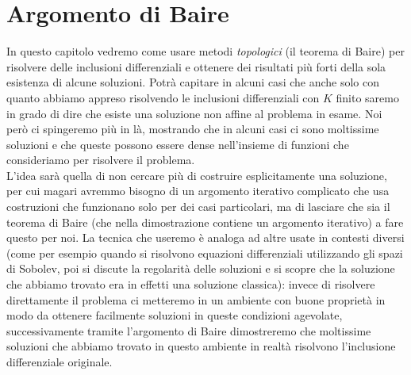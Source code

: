 \documentclass[a4paper,11pt]{book}
\theoremstyle{plain}
\theoremstyle{definition}
\theoremstyle{remark}
\begin{document}
	
\chapter{Argomento di Baire}
In questo capitolo vedremo come usare metodi \textit{topologici} (il teorema di Baire) per risolvere delle inclusioni differenziali e ottenere dei risultati più forti della sola esistenza di alcune soluzioni. Potrà capitare in alcuni casi che anche solo con quanto abbiamo appreso risolvendo le inclusioni differenziali con $K$ finito saremo in grado di dire che esiste una soluzione non affine al problema in esame. Noi però ci spingeremo più in là, mostrando che in alcuni casi ci sono moltissime soluzioni e che queste possono essere dense nell'insieme di funzioni che consideriamo per risolvere il problema.\\
L'idea sarà quella di non cercare più di costruire esplicitamente una soluzione, per cui magari avremmo bisogno di un argomento iterativo complicato che usa costruzioni che funzionano solo per dei casi particolari, ma di lasciare che sia il teorema di Baire (che nella dimostrazione contiene un argomento iterativo) a fare questo per noi. La tecnica che useremo è analoga ad altre usate in contesti diversi (come per esempio quando si risolvono equazioni differenziali utilizzando gli spazi di Sobolev, poi si discute la regolarità delle soluzioni e si scopre che la soluzione che abbiamo trovato era in effetti una soluzione classica): invece di risolvere direttamente il problema ci metteremo in un ambiente con buone proprietà in modo da ottenere facilmente soluzioni in queste condizioni agevolate, successivamente tramite l'argomento di Baire dimostreremo che moltissime soluzioni che abbiamo trovato in questo ambiente in realtà risolvono l'inclusione differenziale originale.
\end{document}
